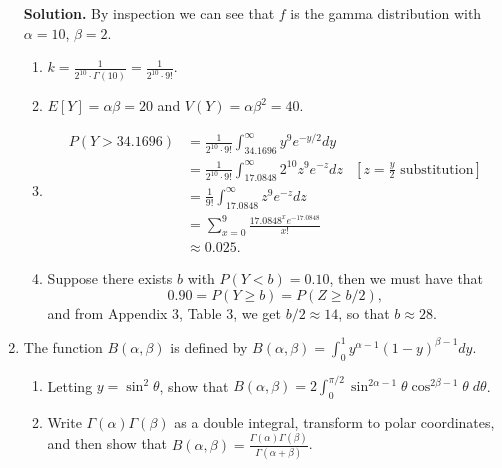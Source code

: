 \documentclass[9pt]{article}
\newcommand{\D}{\displaystyle}
\begin{document}
\begin{enumerate}
      \textbf{Solution.} By inspection we can see that $f$ is the gamma 
      distribution with $\alpha = 10$, $\beta = 2$.
      \begin{enumerate}
         \item $\D k = \frac{1}{2^{10} \cdot \Gamma(10)} =
               \frac{1}{2^{10} \cdot 9!}$.
         \item $E[Y] = \alpha\beta = 20$ and $V(Y) = \alpha\beta^2 = 40$.
         \item \begin{align*}
                  P(Y > 34.1696) &= \frac{1}{2^{10} \cdot 9!}
                     \int_{34.1696}^\infty y^9e^{-y/2} dy \\
                     &= \frac{1}{2^{10} \cdot 9!}
                     \int_{17.0848}^\infty 2^{10}z^9e^{-z} dz
                     &\left[z = \frac{y}{2} \text{ substitution}\right]  \\
                     &= \frac{1}{9!}
                     \int_{17.0848}^\infty z^9e^{-z} dz \\
                     &= \sum_{x=0}^9\frac{17.0848^xe^{-17.0848}}{x!} \\
                     &\approx 0.025.
               \end{align*}
         \item Suppose there exists $b$ with $P(Y < b) = 0.10$, then we must
               have that
               $$0.90 = P(Y \ge b) = P(Z \ge b/2),$$
               and from Appendix 3, Table 3, we get $b/2 \approx 14$, so that
               $b \approx 28$.
      \end{enumerate}
   \item The function $B(\alpha, \beta)$ is defined by
         $\D B(\alpha, \beta) = \int_0^1y^{\alpha - 1}(1 - y)^{\beta - 1} dy$.
         \begin{enumerate}
            \item Letting $y = \sin^2\theta$, show that
                  $\D B(\alpha, \beta) = 2\int_0^{\pi/2}\sin^{2\alpha - 1}\theta
                  \cos^{2\beta - 1}\theta\;d\theta$.
            \item Write $\Gamma(\alpha)\Gamma(\beta)$ as a double integral,
                  transform to polar coordinates, and then show that
                  $B(\alpha, \beta) = \D\frac{\Gamma(\alpha)\Gamma(\beta)}{\Gamma(\alpha +\beta)}$.
         \end{enumerate}
\end{enumerate}
\end{document}
